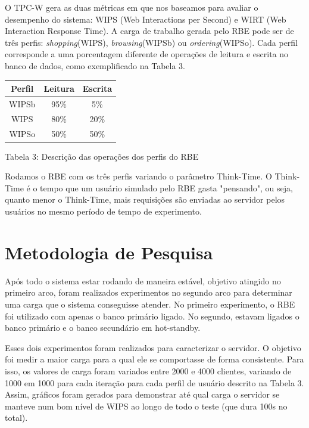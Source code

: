 \documentclass[11pt,twoside]{article}
\begin{document}
    O TPC-W gera as duas métricas em que nos baseamos para avaliar o desempenho do sistema: WIPS (Web Interactions per Second) e WIRT (Web Interaction Response Time). A carga de trabalho gerada pelo RBE pode ser de tr\^es perfis: \textit{shopping}(WIPS), \textit{browsing}(WIPSb) ou \textit{ordering}(WIPSo). Cada perfil corresponde a uma porcentagem diferente de operações de leitura e escrita no banco de dados, como exemplificado na Tabela 3.

        \begin{center}
        \begin{tabular} { | c | c | c |}
        \hline
        Perfil  & Leitura & Escrita \\ \hline
        WIPSb & 95\% & 5\% \\ \hline
        WIPS & 80\% & 20\% \\ \hline
        WIPSo & 50\% & 50\% \\
        \hline
        \end{tabular}

        Tabela 3: Descrição das operações dos perfis do RBE
    \end{center}


    Rodamos o RBE com os três perfis variando o parâmetro Think-Time. O Think-Time é o tempo que um usuário simulado pelo RBE gasta "pensando", ou seja, quanto menor o Think-Time, mais requisições são enviadas ao servidor pelos usuários no mesmo período de tempo de experimento.

\section{Metodologia de Pesquisa}
\setlength{\parindent}{4ex}
Após todo o sistema estar rodando de maneira estável, objetivo atingido no primeiro arco, foram realizados experimentos no segundo arco para determinar uma carga que o sistema conseguisse atender. No primeiro experimento, o RBE foi utilizado com apenas o banco primário ligado. No segundo, estavam ligados o banco primário e o banco secundário em hot-standby.

Esses dois experimentos foram realizados para caracterizar o servidor. O objetivo foi medir a maior carga para a qual ele se comportasse de forma consistente. Para isso, os valores de carga foram variados entre 2000 e 4000 clientes, variando de 1000 em 1000 para cada iteração para cada perfil de usuário descrito na Tabela 3. Assim,  gráficos foram gerados para demonstrar até qual carga o servidor se manteve num bom nível de WIPS ao longo de todo o teste (que dura 100s no total).
\end{document}
